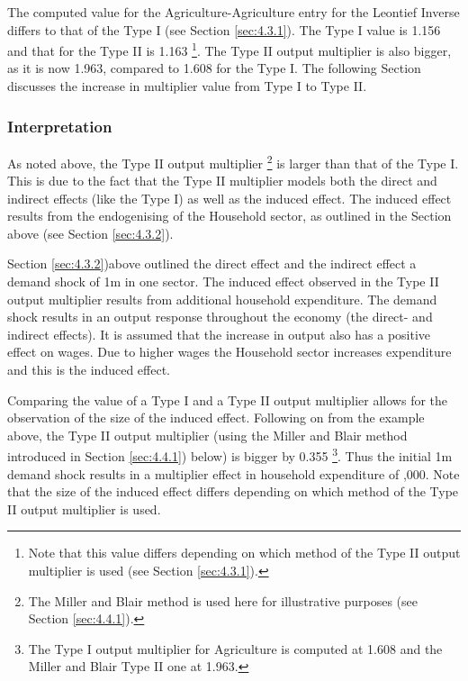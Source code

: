 \begin{doublespacing}
The computed value for the Agriculture-Agriculture entry for the Leontief Inverse differs to that of the Type I (see Section \ref{sec:4.3.1}). The Type I value is 1.156 and that for the Type II is 1.163 \footnote{ Note that this value differs depending on which method of the Type II output multiplier is used (see Section \ref{sec:4.3.1}).}. The Type II output multiplier is also bigger, as it is now 1.963, compared to 1.608 for the Type I. The following Section discusses the increase in multiplier value from Type I to Type II.

\subsubsection{Interpretation}

As noted above, the Type II output multiplier \footnote{ The Miller and Blair  method is used here for illustrative purposes (see Section \ref{sec:4.4.1}).} is larger than that of the Type I. This is due to the fact that the Type II multiplier models both the direct and indirect effects (like the Type I) as well as the induced effect. The induced effect results from the endogenising of the Household sector, as outlined in the Section above (see Section \ref{sec:4.3.2}).

\bigskip

Section \ref{sec:4.3.2})above outlined the direct effect and the indirect effect a demand shock of \textsterling1m in one sector. The induced effect observed in the Type II output multiplier results from additional household expenditure. The demand shock results in an output response throughout the economy (the direct- and indirect effects). It is assumed that the increase in output also has a positive effect on wages. Due to higher wages the Household sector increases expenditure and this is the induced effect.

\bigskip

Comparing the value of a Type I and a Type II output multiplier allows for the observation of the size of the induced effect. Following on from the example above, the Type II output multiplier (using the Miller and Blair  method introduced in Section \ref{sec:4.4.1}) below) is bigger by 0.355 \footnote{ The Type I output multiplier for Agriculture is computed at 1.608 and the Miller and Blair  Type II one at 1.963.}. Thus the initial \textsterling1m demand shock results in a multiplier effect in household expenditure of ,000. Note that the size of the induced effect differs depending on which method of the Type II output multiplier is used.


\end{doublespacing}

